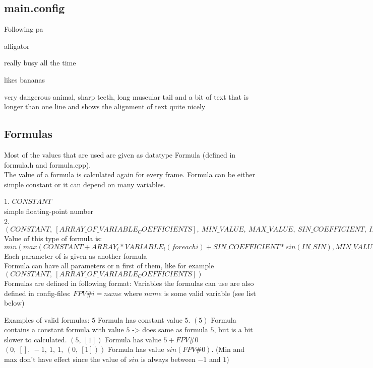\documentclass{article}
\begin{document}
    \subsection{main.config}
      Following pa
      \begin{labeling}{alligator}
      \item [ant] really busy all the time
      \item [chimp] likes bananas
      \item [alligator] very dangerous animal, sharp teeth, long
      muscular tail and a bit of text that is longer than one
      line and shows the alignment of text quite nicely
      \end{labeling}
        
    \subsection{Formulas}
      Most of the values that are used are given as datatype Formula (defined in formula.h and formula.cpp).\\
      The value of a formula is calculated again for every frame. Formula can be either simple constant or it can depend on many variables. 
      
      1. $CONSTANT$  \\
      simple floating-point number   \\
      2. $(CONSTANT,\ [ARRAY\_OF\_VARIABLE_COEFFICIENTS],\ MIN\_VALUE,\ MAX\_VALUE,\ SIN\_COEFFICIENT,\ IN\_SIN)$  \\
      Value of this type of formula is:  \\
      $min(max(CONSTANT + ARRAY_i*VARIABLE_i (for each i) + SIN\_COEFFICIENT * sin(IN\_SIN), MIN\_VALUE), MAX\_VALUE)$ \\
      Each parameter of is given as another formula \\
      Formula can have all parameters or n first of them, like for example $(CONSTANT,\ [ARRAY\_OF\_VARIABLE_COEFFICIENTS])$ \\

      Formulas are defined in following format:  
      Variables the formulas can use are also defined in config-files:
      $FPV\#i=name$
        where $name$ is some valid variable (see list below)
    
    
      Examples of valid formulas:
        $5$
          Formula has constant value $5$.
        $(5)$
          Formula contains a constant formula with value $5$ -> does same as formula $5$, but is a bit slower to calculated.
        $(5,\ [1])$
          Formula has value $5+FPV\#0$
        $(0,\ [],\ -1,\ 1,\ 1,\ (0,\ [1]))$
          Formula has value $sin(FPV\#0)$. (Min and max don't have effect since the value of $sin$ is always between $-1$ and $1$)
\end{document}

